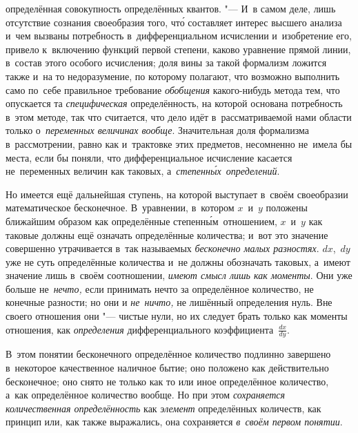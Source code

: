 определённая совокупность определённых квантов. "--- И~в самом деле, лишь
отсутствие сознания своеобразия того, чт\'{о} составляет интерес высшего анализа
и~чем вызваны потребность в~дифференциальном исчислении и~изобретение его,
привело к~включению функций первой степени, каково уравнение прямой линии,
в~состав этого особого исчисления; доля вины за такой формализм ложится также
и~на то недоразумение, по которому полагают, что возможно выполнить само
по~себе правильное требование {\em обобщения} какого-нибудь метода тем, что
опускается та {\em специфическая} определённость, на которой основана
потребность в~этом методе, так что считается, что дело идёт в~рассматриваемой
нами области только о~{\em переменных величинах вообще}. Значительная доля
формализма в~рассмотрении, равно как и~трактовке этих предметов, несомненно
не~имела бы места, если бы поняли, что дифференциальное исчисление касается
не~переменных величин как таковых, а~{\em степенн\'{ы}х~определений}.

Но имеется ещё дальнейшая ступень, на которой выступает в~своём своеобразии
математическое бесконечное. В~уравнении, в~котором $x$~и~$y$ положены ближайшим
образом как определённые степенн\'{ы}м~отношением, $x$~и~$y$ как
таковые должны ещё означать определённые количества; и~вот это
значение совершенно утрачивается в~так называемых
{\em бесконечно малых разностях}. $dx$,~$dy$ уже не суть определённые
количества и~не должны обозначать таковых, а~имеют значение лишь в~своём
соотношении, {\em имеют смысл лишь как моменты}. Они уже больше
не~{\em нечто,} если принимать нечто за определённое количество, не конечные
разности; но они и {\em не~ничто,} не лишённый определения нуль. Вне своего
отношения они "--- чистые нули, но их следует брать только как моменты
отношения, как {\em определения} дифференциального
коэффициента~$\frac{dx}{dy}$.

В~этом понятии бесконечного определённое количество подлинно завершено
в~некоторое качественное наличное бытие; оно положено как действительно
бесконечное; оно снято не только как то или иное определённое количество,
а~как определённое количество вообще. Но при этом
{\em сохраняется количественная определённость} как {\em элемент}
определённых количеств, как принцип или, как также выражались,
она сохраняется {\em в~своём первом понятии}.

